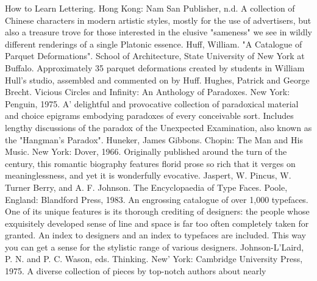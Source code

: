 How to Learn Lettering. Hong Kong: Nam San Publisher, n.d. A collection of Chinese
  characters in modern artistic styles, mostly for the use of advertisers, but also a treasure
  trove for those interested in the elusive "sameness" we see in wildly different renderings of
  a single Platonic essence.
Huff, William. "A Catalogue of Parquet Deformations". School of Architecture, State
  University of New York at Buffalo. Approximately 35 parquet deformations created by
  students in William Hull's studio, assembled and commented on by Huff.
Hughes, Patrick and George Brecht. Vicious Circles and Infinity: An Anthology of
  Paradoxes. New York: Penguin, 1975. A' delightful and provocative collection of
  paradoxical material and choice epigrams embodying paradoxes of every conceivable sort.
  Includes lengthy discussions of the paradox of the Unexpected Examination, also known as
  the "Hangman's Paradox".
Huneker, James Gibbons. Chopin: The Man and His Music. New York: Dover, 1966.
  Originally published around the turn of the century, this romantic biography features florid
  prose so rich that it verges on meaninglessness, and yet it is wonderfully evocative.
Jaspert, W. Pincus, W. Turner Berry, and A. F. Johnson. The Encyclopaedia of Type Faces.
  Poole, England: Blandford Press, 1983. An engrossing catalogue of over 1,000 typefaces.
  One of its unique features is its thorough crediting of designers: the people whose
  exquisitely developed sense of line and space is far too often completely taken for granted.
  An index to designers and an index to typefaces are included. This way you can get a sense
  for the stylistic range of various designers.
Johnson-L'Laird, P. N. and P. C. Wason, eds. Thinking. New' York: Cambridge University
  Press, 1975. A diverse collection of pieces by top-notch authors about nearly


